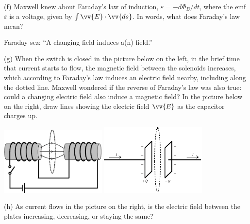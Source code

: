 (f) Maxwell knew about Faraday's law of induction, $\varepsilon=-d \Phi_B/dt$, where the emf $\varepsilon$ is a voltage, given by $\oint \vv{E} \cdot \vv{ds}$.  In words, what does Faraday's law mean?
\begin{center}
Faraday sez: ``A changing \underline{\hspace{1in}} field induces a(n) \underline{\hspace{1in}} field.''
\end{center}
(g) When the switch is closed in the picture below on the left, in the brief time that current starts to flow, the magnetic field between the solenoids increases, which according to Faraday's law induces an electric field nearby, including along the dotted line.  Maxwell wondered if the reverse of Faraday's law was also true: could a changing electric field also induce a magnetic field?  In the picture below on the right, draw lines showing the electric field $\vv{E}$ as the capacitor charges up. 
\begin{center}
\vspace{-0.1in}
    \includegraphics[width=0.4\textwidth]{deriving_em_waves/faradays_law.eps}
    \hspace{0.5in}
    \includegraphics[width=0.4\textwidth]{deriving_em_waves/capacitor_and_loop.eps}
\vspace{-0.1in}
\end{center}

(h) As current flows in the picture on the right, is the electric field between the plates increasing, decreasing, or staying the same?
\answerspace{0.3in}

